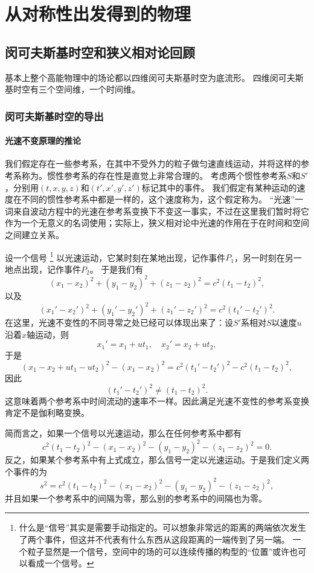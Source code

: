 \chapter{从对称性出发得到的物理}

\section{闵可夫斯基时空和狭义相对论回顾}

基本上整个高能物理中的场论都以四维闵可夫斯基时空为底流形。
四维闵可夫斯基时空有三个空间维，一个时间维。

\subsection{闵可夫斯基时空的导出}

\subsubsection{光速不变原理的推论}

我们假定存在一些参考系，在其中不受外力的粒子做匀速直线运动，并将这样的参考系称为。惯性参考系的存在性是直觉上非常合理的。
考虑两个惯性参考系$S$和$S'$，分别用$(t, x, y, z)$和$(t', x', y', z')$标记其中的事件。
我们假定有某种运动的速度在不同的惯性参考系中都是一样的，这个速度称为，这个假定称为。
“光速”一词来自波动方程中的光速在参考系变换下不变这一事实，不过在这里我们暂时将它作为一个无意义的名词使用；实际上，狭义相对论中光速的作用在于在时间和空间之间建立关系。

设一个信号%
\footnote{什么是“信号”其实是需要手动指定的。可以想象非常远的距离的两端依次发生了两个事件，但这并不代表有什么东西从这段距离的一端传到了另一端。
一个粒子显然是一个信号，空间中的场的可以连续传播的构型的“位置”或许也可以看成一个信号。
}%
以光速运动，它某时刻在某地出现，记作事件$P_1$，另一时刻在另一地点出现，记作事件$P_2$。
于是我们有
\[
    (x_1 - x_2)^2 + (y_1 - y_2)^2 + (z_1 - z_2)^2 = c^2 (t_1 - t_2)^2, 
\]
以及
\[
    (x_1' - x_2')^2 + (y_1' - y_2')^2 + (z_1' - z_2')^2 = c^2 (t_1' - t_2')^2.
\]
在这里，光速不变性的不同寻常之处已经可以体现出来了：设$S'$系相对$S$以速度$u$沿着$x$轴运动，则
\[
    x_1' = x_1 + u t_1, \quad x_2' = x_2 + u t_2,
\]
于是
\[
    (x_1 - x_2 + u t_1 - u t_2)^2 - (x_1 - x_2)^2 = c^2 (t_1' - t_2')^2 - c^2 (t_1 - t_2)^2,
\]
因此
\[
    (t_1' - t_2')^2 \neq (t_1 - t_2)^2.
\]
这意味着两个参考系中时间流动的速率不一样。因此满足光速不变性的参考系变换肯定不是伽利略变换。

简而言之，如果一个信号以光速运动，那么在任何参考系中都有
\[
    c^2 (t_1 - t_2)^2 - (x_1 - x_2)^2 - (y_1 - y_2)^2 - (z_1 - z_2)^2 = 0.    
\]
反之，如果某个参考系中有上式成立，那么信号一定以光速运动。于是我们定义两个事件的为
\begin{equation}
    s^2 = c^2 (t_1 - t_2)^2 - (x_1 - x_2)^2 - (y_1 - y_2)^2 - (z_1 - z_2)^2,
\end{equation}
并且如果一个参考系中的间隔为零，那么别的参考系中的间隔也为零。

